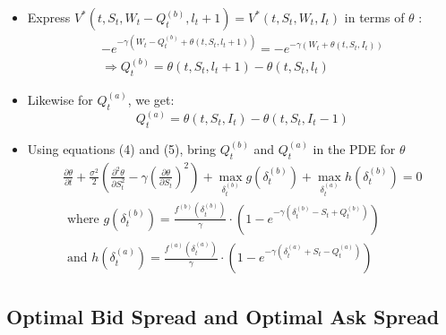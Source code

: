 \documentclass[10pt]{article}
\begin{document}
\begin{itemize} 
    \item Express $V^{*}\left(t, S_{t}, W_{t}-Q_{t}^{(b)}, l_{t}+1\right)=V^{*}\left(t, S_{t}, W_{t}, I_{t}\right)$ in terms of $\theta$ :
    \[
    \begin{array}{c}
    -e^{-\gamma\left(W_{t}-Q_{t}^{(b)}+\theta\left(t, S_{t}, l_{t}+1\right)\right)}=-e^{-\gamma\left(W_{t}+\theta\left(t, S_{t}, I_{t}\right)\right)} \\
    \Rightarrow Q_{t}^{(b)}=\theta\left(t, S_{t}, l_{t}+1\right)-\theta\left(t, S_{t}, l_{t}\right)
    \end{array} \tag{4}
    \]
    \item Likewise for $Q_{t}^{(a)}$, we get:
    \[
    Q_{t}^{(a)}=\theta\left(t, S_{t}, I_{t}\right)-\theta\left(t, S_{t}, I_{t}-1\right) \tag{5}
    \]
    \item Using equations (4) and (5), bring $Q_{t}^{(b)}$ and $Q_{t}^{(a)}$ in the PDE for $\theta$
    $$
    \begin{array}{c}
    \frac{\partial \theta}{\partial t}+\frac{\sigma^{2}}{2}\left(\frac{\partial^{2} \theta}{\partial S_{t}^{2}}-\gamma\left(\frac{\partial \theta}{\partial S_{t}}\right)^{2}\right)+\max _{\delta_{t}^{(b)}} g\left(\delta_{t}^{(b)}\right)+\max _{\delta_{t}^{(a)}} h\left(\delta_{t}^{(b)}\right)=0 \\
    \text { where } g\left(\delta_{t}^{(b)}\right)=\frac{f^{(b)}\left(\delta_{t}^{(b)}\right)}{\gamma} \cdot\left(1-e^{-\gamma\left(\delta_{t}^{(b)}-S_{t}+Q_{t}^{(b)}\right)}\right) \\
    \text { and } h\left(\delta_{t}^{(a)}\right)=\frac{f^{(a)}\left(\delta_{t}^{(a)}\right)}{\gamma} \cdot\left(1-e^{-\gamma\left(\delta_{t}^{(a)}+S_{t}-Q_{t}^{(a)}\right)}\right)
    \end{array}
    $$
\end{itemize}

\subsection{Optimal Bid Spread and Optimal Ask Spread}
\end{document}
